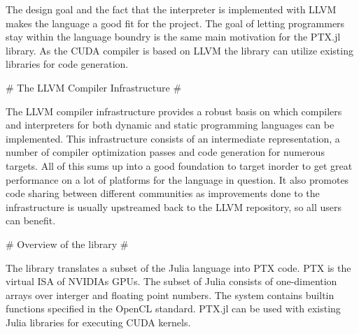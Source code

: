 \begin{markdown}
The design goal and the fact that the interpreter is implemented with
\gls{LLVM} makes the language a good fit for the project. The goal of
letting programmers stay within the language boundry is the same main
motivation for the PTX.jl library. As the \gls{CUDA} compiler is based
on \gls{LLVM} the library can utilize existing libraries for code
generation.

# The LLVM Compiler Infrastructure #

The \gls{LLVM} compiler infrastructure provides a robust basis on
which compilers and interpreters for both dynamic and static
programming languages can be implemented. This infrastructure consists
of an intermediate representation, a number of compiler optimization
passes and code generation for numerous targets. All of this sums up
into a good foundation to target inorder to get great performance on a
lot of platforms for the language in question. It also promotes code
sharing between different communities as improvements done to the
infrastructure is usually upstreamed back to the LLVM repository, so
all users can benefit.

# Overview of the library #

The library translates a subset of the Julia language into \gls{PTX}
code. \gls{PTX} is the virtual \gls{ISA} of NVIDIAs \glspl{GPU}. The
subset of Julia consists of one-dimention arrays over interger and
floating point numbers. The system contains builtin functions
specified in the \gls{OpenCL} standard. PTX.jl can be used
with existing Julia libraries for executing CUDA kernels.

\end{markdown}
